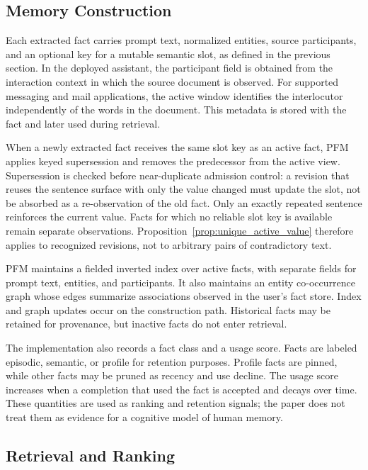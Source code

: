 \documentclass[letterpaper]{article} %
\begin{document}
\subsection{Memory Construction}

Each extracted fact carries prompt text, normalized entities, source participants, and an optional key for a mutable semantic slot, as defined in the previous section. In the deployed assistant, the participant field is obtained from the interaction context in which the source document is observed. For supported messaging and mail applications, the active window identifies the interlocutor independently of the words in the document. This metadata is stored with the fact and later used during retrieval.

When a newly extracted fact receives the same slot key as an active fact, PFM applies keyed supersession and removes the predecessor from the active view. Supersession is checked before near-duplicate admission control: a revision that reuses the sentence surface with only the value changed must update the slot, not be absorbed as a re-observation of the old fact. Only an exactly repeated sentence reinforces the current value. Facts for which no reliable slot key is available remain separate observations. Proposition~\ref{prop:unique_active_value} therefore applies to recognized revisions, not to arbitrary pairs of contradictory text.

PFM maintains a fielded inverted index over active facts, with separate fields for prompt text, entities, and participants. It also maintains an entity co-occurrence graph whose edges summarize associations observed in the user's fact store. Index and graph updates occur on the construction path. Historical facts may be retained for provenance, but inactive facts do not enter retrieval.

The implementation also records a fact class and a usage score. Facts are labeled episodic, semantic, or profile for retention purposes. Profile facts are pinned, while other facts may be pruned as recency and use decline. The usage score increases when a completion that used the fact is accepted and decays over time. These quantities are used as ranking and retention signals; the paper does not treat them as evidence for a cognitive model of human memory.

\subsection{Retrieval and Ranking}
\end{document}
